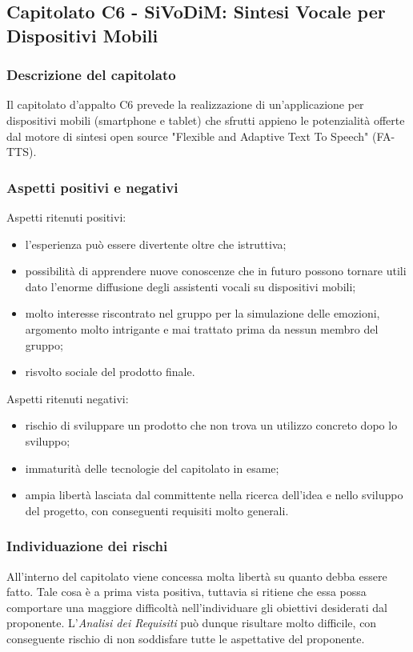 \documentclass[../StudioDiFattibilita.tex]{subfiles}
\begin{document}
	\subsection{Capitolato C6 - SiVoDiM: Sintesi Vocale per Dispositivi Mobili}
		\subsubsection{Descrizione del capitolato}
		Il capitolato d'appalto C6 prevede la realizzazione di un'applicazione per dispositivi mobili (smartphone e tablet) che sfrutti appieno le potenzialità offerte dal motore di sintesi open source "Flexible and Adaptive Text To Speech" (FA-TTS).
		\subsubsection{Aspetti positivi e negativi}
		Aspetti ritenuti positivi:
			\begin{itemize}
				\item l'esperienza può essere divertente oltre che istruttiva;
				\item possibilità di apprendere nuove conoscenze che in futuro possono tornare utili dato l'enorme diffusione degli assistenti vocali su dispositivi mobili;
				\item molto interesse riscontrato nel gruppo per la simulazione delle emozioni, argomento molto intrigante e mai trattato prima da nessun membro del gruppo;
				\item risvolto sociale del prodotto finale.
			\end{itemize}
		Aspetti ritenuti negativi:
			\begin{itemize}
				\item rischio di sviluppare un prodotto che non trova un utilizzo concreto dopo lo sviluppo;
				\item immaturità delle tecnologie del capitolato in esame;
				\item ampia libertà lasciata dal committente nella ricerca dell'idea e nello sviluppo del progetto, con conseguenti requisiti molto generali.
			\end{itemize}
		\subsubsection{Individuazione dei rischi}
		All'interno del capitolato viene concessa molta libertà su quanto debba essere fatto. Tale cosa è a prima vista positiva, tuttavia si ritiene che essa possa comportare una maggiore difficoltà nell'individuare gli obiettivi desiderati dal proponente. L'\textit{Analisi dei Requisiti} può dunque risultare molto difficile, con conseguente rischio di non soddisfare tutte le aspettative del proponente.
\end{document}
